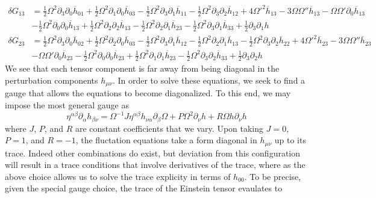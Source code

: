 \documentclass[10pt,letterpaper]{article}
\newcommand{\be}{\begin{equation}} %
\newcommand{\ee}{\end{equation}} %
\newcommand{\pd}{\partial}
\numberwithin{equation}{section}
\begin{document}
\begin{align}
	\delta G_{13} &=\tfrac{1}{2} \Omega^2 \partial_{3} \partial_{0} \overline{h}_{01} + \tfrac{1}{2} \Omega^2 \partial_{1} \partial_{0} \overline{h}_{03} -  \tfrac{1}{2} \Omega^2 \partial_{3} \partial_{1} \overline{h}_{11} -  \tfrac{1}{2} \Omega^2 \partial_{3} \partial_{2} \overline{h}_{12} + 4 \Omega '^2 \overline{h}_{13} - 3 \Omega \Omega '' \overline{h}_{13} -  \Omega \Omega ' \partial_{0} \overline{h}_{13}\\
& -  \tfrac{1}{2} \Omega^2 \partial_{0} \partial_{0} \overline{h}_{13} + \tfrac{1}{2} \Omega^2 \partial_{2} \partial_{2} \overline{h}_{13} -  \tfrac{1}{2} \Omega^2 \partial_{2} \partial_{1} \overline{h}_{23} -  \tfrac{1}{2} \Omega^2 \partial_{3} \partial_{1} \overline{h}_{33} + \tfrac{1}{2} \partial_{3} \partial_{1} h\nonumber
\end{align}
\begin{align}
	\delta G_{23} &=\tfrac{1}{2} \Omega^2 \partial_{3} \partial_{0} \overline{h}_{02} + \tfrac{1}{2} \Omega^2 \partial_{2} \partial_{0} \overline{h}_{03} -  \tfrac{1}{2} \Omega^2 \partial_{3} \partial_{1} \overline{h}_{12} -  \tfrac{1}{2} \Omega^2 \partial_{2} \partial_{1} \overline{h}_{13} -  \tfrac{1}{2} \Omega^2 \partial_{3} \partial_{2} \overline{h}_{22} + 4 \Omega '^2 \overline{h}_{23} - 3 \Omega \Omega '' \overline{h}_{23}\\
& -  \Omega \Omega ' \partial_{0} \overline{h}_{23} -  \tfrac{1}{2} \Omega^2 \partial_{0} \partial_{0} \overline{h}_{23} + \tfrac{1}{2} \Omega^2 \partial_{1} \partial_{1} \overline{h}_{23} -  \tfrac{1}{2} \Omega^2 \partial_{3} \partial_{2} \overline{h}_{33} + \tfrac{1}{2} \partial_{3} \partial_{2} h \nonumber
\end{align}
We see that each tensor component is far away from being diagonal in the perturbation components $h_{\mu\nu}$. In order to solve these equations, we seek to find a gauge that allows the equations to become diagonalized. To this end, we may impose the most general gauge as
\be
	\eta^{\alpha\beta}\pd_{\alpha}h_{\beta\nu} = \Omega^{-1} J \eta^{\alpha\beta}h_{\nu\alpha}\pd_\beta \Omega + P\Omega^2 \pd_\nu h + R \Omega h \pd_\nu h
\ee
where $J$, $P$, and $R$ are constant coefficients that we vary. Upon taking $J = 0$, $P = 1$, and $R = -1$, the fluctation equations take a form diagonal in $h_{\mu\nu}$ up to its trace. Indeed other combinations do exist, but deviation from this configuration will result in a trace conditions that involve derivatives of the trace, where as the above choice allows us to solve the trace explicity in terms of $h_{00}$. To be precise, given the special gauge choice, the trace of the Einstein tensor evaulates to
\end{document}
